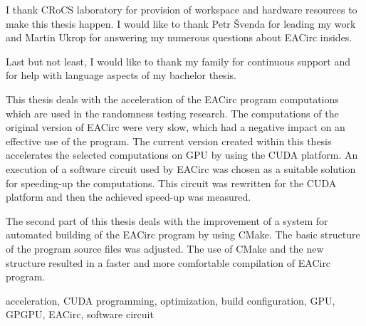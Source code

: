 \documentclass[12pt,twoside]{fithesis2}
\begin{document}
\FrontMatter
	\ThesisTitlePage
	\begin{ThesisDeclaration}
		\DeclarationText
		\AdvisorName
	\end{ThesisDeclaration}
	\begin{ThesisThanks}
		I thank CRoCS laboratory for provision of workspace and hardware resources to make this thesis happen. I would like to thank Petr Švenda for leading my work and Martin Ukrop for answering my numerous questions about EACirc insides.
		
		\bigskip
		
		\noindent
		Last but not least, I would like to thank my family for continuous support and for help with language aspects of my bachelor thesis.
	\end{ThesisThanks}
	\begin{ThesisAbstract}
		This thesis deals with the acceleration of the EACirc program computations which are used in the randomness testing research. The computations of the original version of EACirc were very slow, which had a negative impact on an effective use of the program. The current version created within this thesis accelerates the selected computations on GPU by using the CUDA platform. An execution of a software circuit used by EACirc was chosen as a suitable solution for speeding-up the computations. This circuit was rewritten for the CUDA platform and then the achieved speed-up was measured.
		
		The second part of this thesis deals with the improvement of a system for automated building of the EACirc program by using CMake. The basic structure of the program source files was adjusted. The use of CMake and the new structure resulted in a faster and more comfortable compilation of EACirc program.
	\end{ThesisAbstract}
	\begin{ThesisKeyWords}
		acceleration, CUDA programming, optimization, build configuration, GPU, GPGPU, EACirc, software circuit
	\end{ThesisKeyWords}
	\tableofcontents
	

\MainMatter
\end{document}
